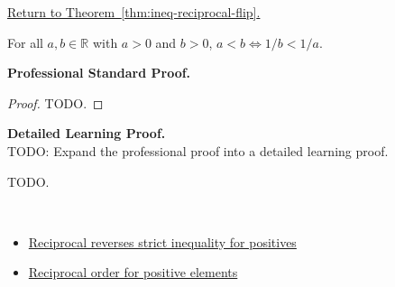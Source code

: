\newpage
{}
\label{prf:ineq-reciprocal-flip}

\begin{remark*}[Return]
\hyperref[thm:ineq-reciprocal-flip]{Return to Theorem~\ref*{thm:ineq-reciprocal-flip}.}
\end{remark*}

\begin{theorem*}
For all $a, b \in \mathbb{R}$ with $a > 0$ and $b > 0$,
$a < b \iff 1/b < 1/a$.
\end{theorem*}

\textbf{Professional Standard Proof.}~\\
\begin{proof}
TODO.
\end{proof}

\textbf{Detailed Learning Proof.}~\\
TODO: Expand the professional proof into a detailed learning proof.


\begin{remark*}
TODO.
\end{remark*}

\begin{remark*}[Dependencies]~\\
\begin{itemize}
  \item \hyperref[thm:ineq-reciprocal-positive]{Reciprocal reverses strict inequality for positives}
  \item \hyperref[thm:reciprocal-order-for-positive-elements]{Reciprocal order for positive elements}
\end{itemize}
\end{remark*}
